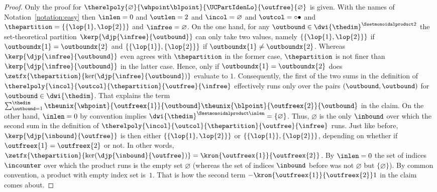 \documentclass[pdftex]{sigma}
\numberwithin{equation}{section}
\begin{document}
{\begin{proof}
    Only the proof for $\therelpoly{\varnothing}{\whpoint\blpoint}{\UCPartIdenLo}{\outfree}{\varnothing}$ is given. With the names of Notation~\ref{notation:easy} then $\inlen=0$ and $\outlen=2$ and $\incol=\varnothing$ and $\outcol=\circ\bullet$ and $\thepartition=\{\{\lop{1},\lop{2}\}\}$ and $\infree=\varnothing$. On the one hand, for any $\outbound\in \dwi{\thedim}^{\Ssetmonoidalproduct 2}$ the set-theoretical partition $\kerp{\djp{\infree}{\outbound}}$ can only take two values, namely    $\{\{\lop{1},\lop{2}\}\}$ if $\outboundx{1}= \outboundx{2}$ and $\{\{\lop{1}\},\{\lop{2}\}\}$ if $\outboundx{1}\neq \outboundx{2}$.  Whereas $\kerp{\djp{\infree}{\outbound}}$ even agrees with $\thepartition$ in the former case, $\thepartition$ is not finer than $\kerp{\djp{\infree}{\outbound}}$ in the latter case. Hence, only if $\outboundx{1}= \outboundx{2}$ does  $\zetfx{\thepartition}{\ker(\djp{\infree}{\outbound})}$ evaluate to $1$. Consequently, the first of the two sums in the definition of $      \therelpoly{\incol}{\outcol}{\thepartition}{\outfree}{\infree}$ effectively runs only over the pairs $(\outbound,\outbound)$ for $\outbound\in\dwi{\thedim}$. That explains the term $ \sum_{\outbound=1}^\thedim \theunix{\whpoint}{\outfreex{1}}{\outbound}\theunix{\blpoint}{\outfreex{2}}{\outbound}$ in the claim. On the other hand, $\inlen=0$ by convention implies $\dwi{\thedim}^{\Ssetmonoidalproduct \inlen}=\{\varnothing\}$. Thus, $\varnothing$ is the only $\inbound$ over which the second sum in the definition of $\therelpoly{\incol}{\outcol}{\thepartition}{\outfree}{\infree}$ runs. Just like before, $\kerp{\djp{\inbound}{\outfree}}$ is then either $\{\{\lop{1},\lop{2}\}\}$ or $\{\{\lop{1}\},\{\lop{2}\}\}$, depending on whether  if $\outfreex{1}= \outfreex{2}$ or not. In other words, $\zetfx{\thepartition}{\ker(\djp{\inbound}{\outfree})}=\kron{\outfreex{1}}{\outfreex{2}}$. By $\inlen=0$ the set of indices $\incounter$ over which the product  runs is the empty set $\varnothing$ (whereas the set of indices $\inbound$ before was not $\varnothing$ but $\{\varnothing\}$).  By common convention, a product with empty index set is~$1$. That is how the second term $-\kron{\outfreex{1}}{\outfreex{2}}1$ in the claim comes about.
  \end{proof}
  }
\end{document}
